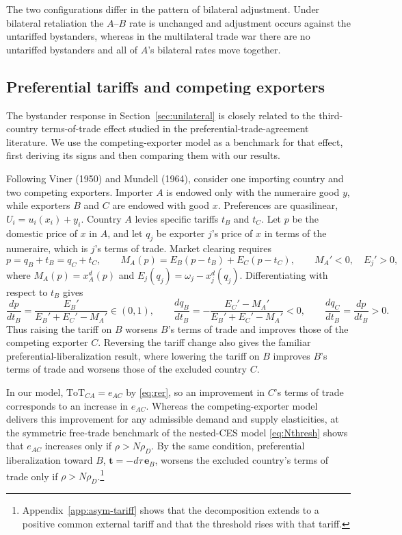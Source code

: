 \documentclass[11pt]{article}
\begin{document}
The two configurations differ in the pattern of bilateral adjustment. Under bilateral retaliation the $A$--$B$ rate is unchanged and adjustment occurs against the untariffed bystanders, whereas in the multilateral trade war there are no untariffed bystanders and all of $A$'s bilateral rates move together.

\subsection{Preferential tariffs and competing exporters}

The bystander response in Section~\ref{sec:unilateral} is closely related to the third-country terms-of-trade effect studied in the preferential-trade-agreement literature. We use the competing-exporter model as a benchmark for that effect, first deriving its signs and then comparing them with our results.

Following Viner (1950) and Mundell (1964), consider one importing country and two competing exporters. Importer $A$ is endowed only with the numeraire good $y$, while exporters $B$ and $C$ are endowed with good $x$. Preferences are quasilinear, $U_i=u_i(x_i)+y_i$. Country $A$ levies specific tariffs $t_B$ and $t_C$. Let $p$ be the domestic price of $x$ in $A$, and let $q_j$ be exporter $j$'s price of $x$ in terms of the numeraire, which is $j$'s terms of trade. Market clearing requires
\begin{equation}
p=q_B+t_B=q_C+t_C, \qquad
M_A(p)=E_B(p-t_B)+E_C(p-t_C), \qquad
M_A'<0, \quad E_j'>0,
\end{equation}
where $M_A(p)=x_A^d(p)$ and $E_j(q_j)=\omega_j-x_j^d(q_j)$. Differentiating with respect to $t_B$ gives
\begin{equation}
\frac{dp}{dt_B}=\frac{E_B'}{E_B'+E_C'-M_A'}\in(0,1), \qquad
\frac{dq_B}{dt_B}=-\frac{E_C'-M_A'}{E_B'+E_C'-M_A'}<0, \qquad
\frac{dq_C}{dt_B}=\frac{dp}{dt_B}>0.
\end{equation}
Thus raising the tariff on $B$ worsens $B$'s terms of trade and improves those of the competing exporter $C$. Reversing the tariff change also gives the familiar preferential-liberalization result, where lowering the tariff on $B$ improves $B$'s terms of trade and worsens those of the excluded country $C$.

In our model, $\mathrm{ToT}_{CA}=e_{AC}$ by \eqref{eq:rer}, so an improvement in $C$'s terms of trade corresponds to an increase in $e_{AC}$. Whereas the competing-exporter model delivers this improvement for any admissible demand and supply elasticities, at the symmetric free-trade benchmark of the nested-CES model \eqref{eq:Nthresh} shows that $e_{AC}$ increases only if $\rho>N\rho_D$. By the same condition, preferential liberalization toward $B$, $\mathbf{t}=-d\tau\,\mathbf{e}_B$, worsens the excluded country's terms of trade only if $\rho>N\rho_D$.\footnote{Appendix~\ref{app:asym-tariff} shows that the decomposition extends to a positive common external tariff and that the threshold rises with that tariff.}
\end{document}
